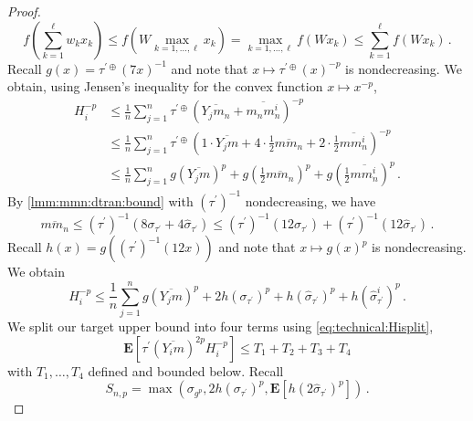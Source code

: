 \documentclass[10pt,a4paper]{amsart}
\newcommand{\E}{\mathbf{E}} %
\newcommand{\EOf}[1]{\E\abOf{#1}}
\newcommand{\ab}[1]{\lab #1 \rab} %
\newcommand{\abOf}[1]{\!\ab{#1}} %
\newcommand{\br}[1]{\lb #1 \rb} %
\newcommand{\brOf}[1]{\!\br{#1}} %
\newcommand{\ddrtran}{\tau^{\prime\oplus}}
\newcommand{\dtran}{\tau\pr}
\newcommand{\eqfs}{\,.}
\newcommand{\invdtran}{(\tau\pr)^{-1}}
\newcommand{\lab}{\left[} %
\newcommand{\lb}{\left(} %
\newcommand{\ol}[2]{\overline{#1#2}}
\newcommand{\pr}{^\prime}
\newcommand{\rab}{\right]} %
\newcommand{\rb}{\right)} %
\begin{document}
\begin{proof}
    \begin{equation}
        f\brOf{\sum_{k=1}^\ell w_k x_k} 
        \leq 
        f\brOf{W \max_{k=1,\dots,\ell} x_k}
        = 
        \max_{k=1,\dots,\ell} f\brOf{W x_k}
        \leq 
        \sum_{k=1}^\ell	f\brOf{W x_k}
        \eqfs
    \end{equation}
    Recall $g(x) = \ddrtran(7 x)^{-1}$ and note that $x\mapsto \ddrtran(x)^{-p}$ is nondecreasing. We obtain, using Jensen's inequality for the convex function $x\mapsto x^{-p}$,
    \begin{align}
        H_i^{-p}
        &\leq
        \frac1n \sum_{j=1}^n \ddrtran(\ol{Y_j}{m_n}+\ol{m_n}{m_n^i})^{-p}
        \\&\leq
        \frac1n \sum_{j=1}^n \ddrtran\brOf{1\cdot\ol{Y_j}{m}+ 4\cdot \frac12 \ol m{m_n} + 2\cdot \frac12 \ol m{m_n^i}}^{-p}
        \\&\leq
        \frac1n \sum_{j=1}^n g(\ol{Y_j}{m})^p + g\brOf{\frac12\ol{m}{m_n}}^p + g\brOf{\frac12\ol{m}{m_n^i}}^p
        \eqfs
    \end{align}
    By \cref{lmm:mmn:dtran:bound} with $\invdtran$ nondecreasing, we have
    \begin{equation}
        \ol m{m_n}
        \leq
        \invdtran\brOf{8 \sigma_{\dtran} + 4 \hat \sigma_{\dtran}} 
        \leq
        \invdtran\brOf{12 \sigma_{\dtran}} + \invdtran\brOf{12 \hat \sigma_{\dtran}} 
        \eqfs
    \end{equation}
    Recall $h(x) = g(\invdtran(12 x))$ and note that $x\mapsto g(x)^p$ is nondecreasing. We obtain
    \begin{equation}\label{eq:technical:Hisplit}
        H_i^{-p}
        \leq
        \frac1n \sum_{j=1}^n g(\ol{Y_j}{m})^p +
        2 h(\sigma_{\dtran})^p +
        h(\hat\sigma_{\dtran})^p
        +
        h(\hat\sigma^i_{\dtran})^p
        \eqfs
    \end{equation}
    We split our target upper bound into four terms using \eqref{eq:technical:Hisplit},
    \begin{equation}\label{eq:technical:Hisplit:T}
        \EOf{\dtran(\ol{Y_i}m)^{2p} H_i^{-p}} \leq T_1 + T_2 + T_3 + T_4
    \end{equation}
    with $T_1, \dots, T_4$ defined and bounded below.
    Recall
    \begin{equation}
            S_{n,p} = \max\brOf{
                \sigma_{g^p}, 
                2 h(\sigma_{\dtran})^p,
                \EOf{ h(2\hat\sigma_{\dtran})^p}
            }
            \eqfs
    \end{equation}

\end{proof}
\end{document}
